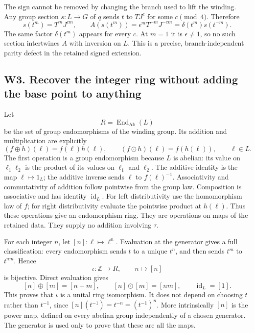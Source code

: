 \documentclass[
  11pt,
]{article}
\begin{document}
The sign cannot be removed by changing the branch used to lift the
winding. Any group section \(s:L\to G\) of \(q\) sends \(t\) to \(TJ^c\)
for some \(c\pmod4\). Therefore \[
s(t^m)=T^mJ^{cm},\qquad
A(s(t^m))=\epsilon^mT^{-m}J^{-cm}
=\delta(t^m)s(t^{-m}).
\] The same factor \(\delta(t^m)\) appears for every \(c\). At \(m=1\)
it is \(\epsilon\ne1\), so no such section intertwines \(A\) with
inversion on \(L\). This is a precise, branch-independent parity defect
in the retained signed extension.

\subsection{W3. Recover the integer ring without adding the base point
to
anything}\label{w3.-recover-the-integer-ring-without-adding-the-base-point-to-anything}

Let \[
R=\operatorname{End}_{\mathrm{Ab}}(L)
\] be the set of group endomorphisms of the winding group. Its addition
and multiplication are explicitly \[
(f\mathbin\oplus h)(\ell)=f(\ell)h(\ell),\qquad
(f\mathbin\odot h)(\ell)=f(h(\ell)),\qquad \ell\in L.
\] The first operation is a group endomorphism because \(L\) is abelian:
its value on \(\ell_1\ell_2\) is the product of its values on \(\ell_1\)
and \(\ell_2\). The additive identity is the map \(\ell\mapsto1_L\); the
additive inverse sends \(\ell\) to \(f(\ell)^{-1}\). Associativity and
commutativity of addition follow pointwise from the group law.
Composition is associative and has identity \(\operatorname{id}_L\). For
left distributivity use the homomorphism law of \(f\); for right
distributivity evaluate the pointwise product at \(h(\ell)\). Thus these
operations give an endomorphism ring. They are operations on maps of the
retained data. They supply no addition involving \(\tau\).

For each integer \(n\), let \([n]:\ell\mapsto\ell^n\). Evaluation at the
generator gives a full classification: every endomorphism sends \(t\) to
a unique \(t^n\), and then sends \(t^m\) to \(t^{nm}\). Hence \[
\iota:\mathbb Z\longrightarrow R,\qquad n\longmapsto[n]
\] is bijective. Direct evaluation gives \[
[n]\oplus[m]=[n+m],\qquad
[n]\odot[m]=[nm],\qquad \operatorname{id}_L=[1].
\] This proves that \(\iota\) is a unital ring isomorphism. It does not
depend on choosing \(t\) rather than \(t^{-1}\), since
\([n](t^{-1})=t^{-n}=(t^{-1})^n\). More intrinsically \([n]\) is the
power map, defined on every abelian group independently of a chosen
generator. The generator is used only to prove that these are all the
maps.
\end{document}
